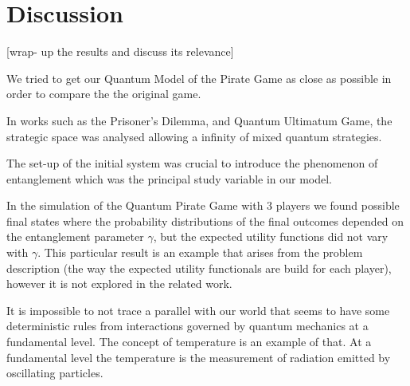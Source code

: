 \clearpage
\section{Discussion}
\label{subsec:3playergame:discution}

[wrap- up the results and discuss its relevance]

We tried to get our Quantum Model of the Pirate Game as close as possible in order to compare the the original game. 

In works such as the Prisoner's Dilemma\cite{Letters2002}\cite{Eisert2008}, and Quantum Ultimatum Game\cite{Fra2011}, the strategic space was analysed allowing a infinity of mixed quantum strategies.

The set-up of the initial system was crucial to introduce the phenomenon of entanglement which was the principal study variable in our model.

In the simulation of the Quantum Pirate Game with $3$ players we found possible final states where the probability distributions of the final outcomes depended on the entanglement parameter $\gamma$, but the expected utility functions did not vary with $\gamma$. This particular result is an example that arises from the problem description (the way the expected utility functionals are build for each player), however it is not explored in the related work. 

It is impossible to not trace a parallel with our world that seems to have some deterministic rules from interactions governed by quantum mechanics at a fundamental level. The concept of temperature is an example of that. At a fundamental level the temperature is the measurement of radiation emitted by oscillating particles. 



 






